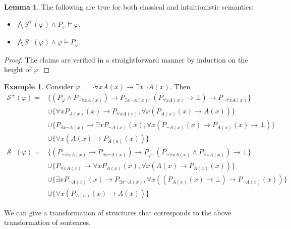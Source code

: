 \documentclass[a4paper,12pt]{report}
\theoremstyle{definition}
\theoremstyle{definition}
\theoremstyle{definition}
\newtheorem{lemma}[theorem]{Lemma}
\theoremstyle{definition}
\theoremstyle{definition}
\theoremstyle{definition}
\newtheorem{example}[theorem]{Example}
\theoremstyle{definition}
\begin{document}
	\begin{lemma}The following are true for both classical and intuitionistic semantics:
		\begin{itemize}
			\item $\bigwedge S^+(\varphi)\wedge P_\varphi\models\varphi$. 
			\item $\bigwedge S^-(\varphi)\wedge \varphi\models P_\varphi$. 
		\end{itemize}
	\end{lemma}

	\begin{proof}
		The claims are verified in a straightforward manner by induction on the height of $\varphi$.
	\end{proof}
	
	\begin{example}
		Consider $\varphi = \neg\forall x A(x)\to \exists x\neg A(x)$. Then
		\begin{align*}
			\mathcal S^+(\varphi) = &\{(P_\varphi\wedge P_{\neg\forall x A(x)})\to P_{\exists x\neg A(x)}, (P_{\forall xA(x)}\to\bot)\to P_{\neg \forall xA(x)}\}\\&\cup\{\forall xP_{A(x)}(x)\to P_{\forall xA(x)}, \forall x(P_{A(x)}(x)\to A(x))\}\\&\cup\{P_{\exists x\neg A(x)}\to \exists xP_{\neg A(x)}(x), \forall x(P_{\neg A(x)}(x)\to P_{A(x)}(x)\to \bot)\}\\&\cup\{\forall x(A(x)\to P_{A(a)}(x))\}\\
			\mathcal S^-(\varphi) = &\{(P_{\neg\forall x A(x)}\to P_{\exists x\neg A(x)})\to P_\varphi,  (P_{\neg \forall xA(x)}\wedge P_{\forall xA(x)})\to\bot\}\\&\cup\{P_{\forall xA(x)}\to \forall xP_{A(x)}(x), \forall x(A(x)\to P_{A(x)}(x))\}\\&\cup\{\exists xP_{\neg A(x)}(x)\to P_{\exists x\neg A(x)}, \forall x((P_{A(x)}(x)\to \bot)\to P_{\neg A(x)}(x))\}\\&\cup\{\forall x(P_{A(a)}(x)\to A(x))\}
		\end{align*}
	\end{example}
		
	We can give a transformation of structures that corresponds to the above transformation of sentences.	
	
\end{document}
